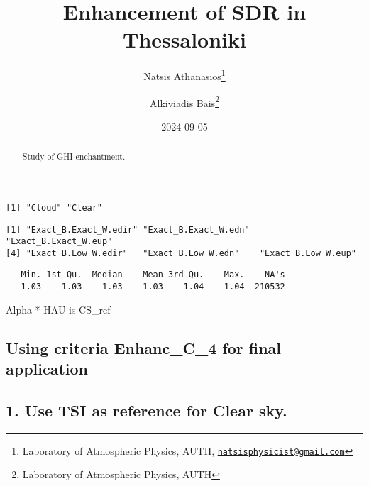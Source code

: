 \documentclass[
  10pt,
  a4paper,oneside]{article}
\title{Enhancement of SDR in Thessaloniki}
\author{Natsis Athanasios\footnote{Laboratory of Atmospheric Physics, AUTH, \href{mailto:natsisphysicist@gmail.com}{\nolinkurl{natsisphysicist@gmail.com}}} \and Alkiviadis Bais\footnote{Laboratory of Atmospheric Physics, AUTH}}
\date{2024-09-05}
\begin{document}
\maketitle
\begin{abstract}
Study of GHI enchantment.
\end{abstract}

{
\hypersetup{linkcolor=}
\setcounter{tocdepth}{4}
\tableofcontents
}
\begin{verbatim}
[1] "Cloud" "Clear"
\end{verbatim}

\begin{verbatim}
[1] "Exact_B.Exact_W.edir" "Exact_B.Exact_W.edn"  "Exact_B.Exact_W.eup" 
[4] "Exact_B.Low_W.edir"   "Exact_B.Low_W.edn"    "Exact_B.Low_W.eup"   
\end{verbatim}

\begin{verbatim}
   Min. 1st Qu.  Median    Mean 3rd Qu.    Max.    NA's 
   1.03    1.03    1.03    1.03    1.04    1.04  210532 
\end{verbatim}

Alpha * HAU is CS\_ref

\hypertarget{using-criteria-enhanc_c_4-for-final-application}{%
\subsection{\texorpdfstring{Using criteria \textbf{Enhanc\_C\_4} for final application}{Using criteria Enhanc\_C\_4 for final application}}\label{using-criteria-enhanc_c_4-for-final-application}}

\hypertarget{use-tsi-as-reference-for-clear-sky.}{%
\subsection{1. Use TSI as reference for Clear sky.}\label{use-tsi-as-reference-for-clear-sky.}}
\end{document}
